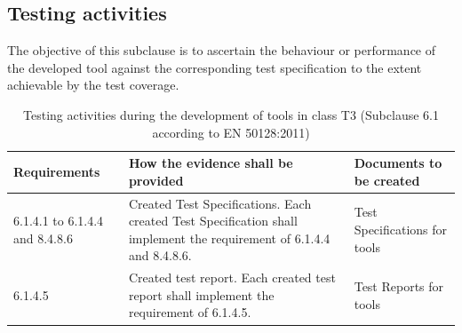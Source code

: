 \documentclass{template/openetcs_report}
\begin{document}
\subsection{Testing activities}
\begin{flushleft}
The objective of this subclause is to ascertain the behaviour or performance of the developed tool against the corresponding test specification to the extent achievable by the test coverage.
\end{flushleft}
{\footnotesize\sffamily\centering
\begin{longtable}{|p{2cm}|p{9cm}|p{3cm}|}
\caption{Testing activities during the development of tools in class T3 (Subclause 6.1 according to EN 50128:2011)}\\
\hline
\bfseries Requirements & \bfseries How the evidence shall be provided & \bfseries Documents to be created\\
\hline
\hline
\endhead
\hline
\endfoot

6.1.4.1 to 6.1.4.4 and 8.4.8.6 & Created Test Specifications. 
Each created Test Specification shall implement the requirement of 6.1.4.4 and 8.4.8.6.
& Test Specifications for tools\\ 
\hline
6.1.4.5 & Created test report. 
Each created test report shall implement the requirement of 6.1.4.5.
& Test Reports for tools\\ 
\hline
\end{longtable}}
\end{document}

